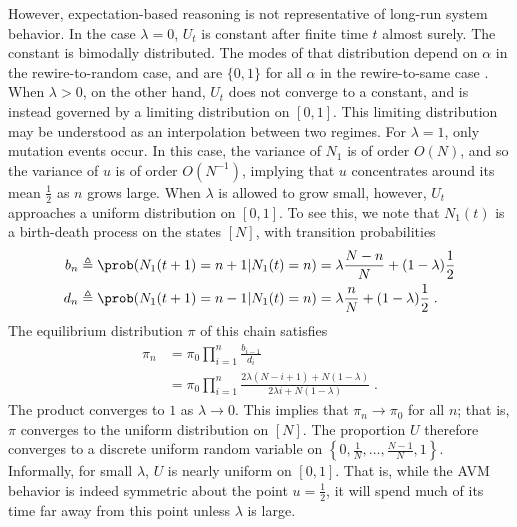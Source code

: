 \documentclass[english]{scrartcl}
\begin{document}
		However, expectation-based reasoning is not representative of long-run system behavior.
		In the case $\lambda = 0$, $U_t$ is constant after finite time $t$ almost surely. 
		The constant is bimodally distributed. 
		The modes of that distribution depend on $\alpha$ in the rewire-to-random case, and are $\{0,1\}$ for all $\alpha$ in the rewire-to-same case \cite{Durrett2012}.
		When $\lambda > 0$, on the other hand, $U_t$ does not converge to a constant, and is instead governed by a limiting distribution on $[0,1]$. 
		This limiting distribution may be understood as an interpolation between two regimes. 
		For $\lambda = 1$, only mutation events occur. 
		In this case, the variance of $N_1$ is of order $O(N)$, and so the variance of $u$ is of order $O(N^{-1})$, implying that $u$ concentrates around its mean $\frac{1}{2}$ as $n$ grows large. 
		When $\lambda$ is allowed to grow small, however, $U_t$ approaches a uniform distribution on $[0,1]$. 
		To see this, we note that $N_1(t)$ is a birth-death process on the states $[N]$, with transition probabilities
		\begin{align}
			b_n &\triangleq \prob(N_1(t+1) = n+1 | N_1(t) = n) = \lambda \frac{N - n}{N} + (1-\lambda)\frac{1}{2}\\ 
			d_n &\triangleq \prob(N_1(t+1) = n-1 | N_1(t) = n) = \lambda \frac{n}{N} + (1-\lambda)\frac{1}{2}\;.
		\end{align}
		The equilibrium distribution $\pi$ of this chain satisfies 
		\begin{align}
			\pi_n &= \pi_0\prod_{i = 1}^n \frac{b_{i - 1}}{d_{i}}  \\ 
				  &= \pi_0\prod_{i = 1}^n \frac{2\lambda (N-i+1) + N(1-\lambda)}{2\lambda i + N(1-\lambda)}\;. 
		\end{align}
		The product converges to $1$ as $\lambda \rightarrow 0$. 
		This implies that $\pi_n \rightarrow \pi_0$ for all $n$; that is, $\pi$ converges to the uniform distribution on $[N]$. 
		The proportion $U$ therefore converges to a discrete uniform random variable on $\left\{0,\frac{1}{N}, \ldots,\frac{N-1}{N}, 1\right\}$. 
		Informally, for small $\lambda$, $U$ is nearly uniform on $[0,1]$. 
		That is, while the AVM behavior is indeed symmetric about the point $u = \frac{1}{2}$, it will spend much of its time far away from this point unless $\lambda$ is large. 
\end{document}
